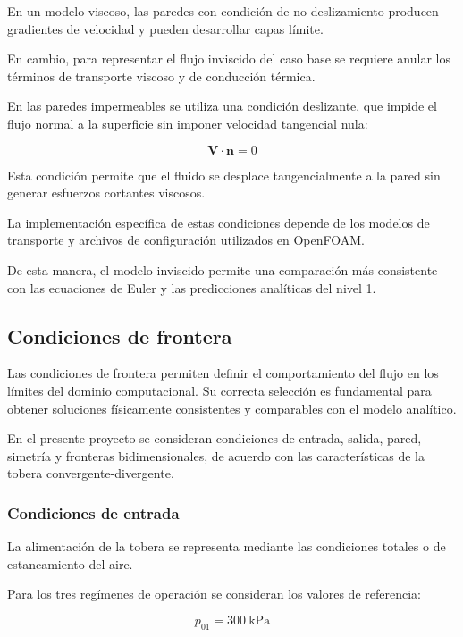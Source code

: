 \documentclass[12pt,letterpaper]{article}
\numberwithin{equation}{section}
\begin{document}
En un modelo viscoso, las
paredes con condición de
no deslizamiento producen
gradientes de velocidad y
pueden desarrollar capas límite.

En cambio, para representar
el flujo inviscido del caso
base se requiere anular los
términos de transporte viscoso
y de conducción térmica.

En las paredes impermeables
se utiliza una condición
deslizante, que impide el
flujo normal a la superficie
sin imponer velocidad
tangencial nula:

\begin{equation}
\mathbf{V}\cdot\mathbf{n}=0
\end{equation}

Esta condición permite que
el fluido se desplace
tangencialmente a la pared
sin generar esfuerzos
cortantes viscosos.

La implementación específica
de estas condiciones depende
de los modelos de transporte
y archivos de configuración
utilizados en OpenFOAM.

De esta manera, el modelo
inviscido permite una
comparación más consistente
con las ecuaciones de Euler
y las predicciones analíticas
del nivel 1.


\subsection{Condiciones de frontera}

Las condiciones de frontera permiten definir
el comportamiento del flujo en los límites
del dominio computacional. Su correcta
selección es fundamental para obtener
soluciones físicamente consistentes y
comparables con el modelo analítico.

En el presente proyecto se consideran
condiciones de entrada, salida, pared,
simetría y fronteras bidimensionales,
de acuerdo con las características
de la tobera convergente-divergente.

\subsubsection{Condiciones de entrada}

La alimentación de la tobera se representa
mediante las condiciones totales o de
estancamiento del aire.

Para los tres regímenes de operación
se consideran los valores de referencia:

\begin{equation}
    p_{01}=300\ \mathrm{kPa}
\end{equation}
\end{document}
